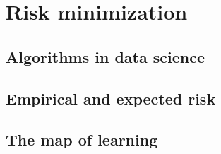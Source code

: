 \section{Risk minimization}

\subsection{Algorithms in data science}

\subsection{Empirical and expected risk}

\subsection{The map of learning}

